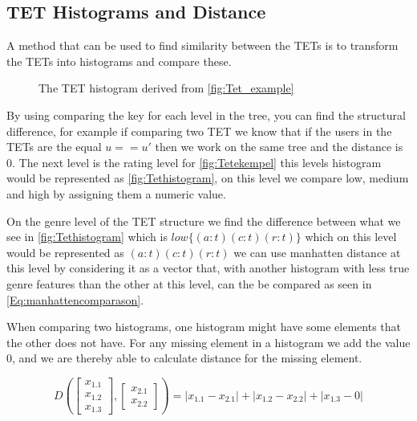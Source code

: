 \subsection{TET Histograms and Distance}
	A method that can be used to find similarity between the TETs is to transform the TETs into histograms and compare these\cite{JAEGER201330}. 
	\begin{figure}[H]
		\centering
		\begin{adjustbox}{width=0.5\textwidth}
			
		\end{adjustbox}
		\caption{The TET histogram derived from \autoref{fig:Tet_example}}
		\label{fig:Tethistogram}
	\end{figure}

	By using comparing the key for each level in the tree, you can find the structural difference, for example if comparing two TET we know that if the users in the TETs are the equal $u == u'$ then we work on the same tree and the distance is $0$. The next level is the rating level for \autoref{fig:Tetekempel} this levels histogram would be represented as \autoref{fig:Tethistogram}, on this level we compare low, medium and high by assigning them a numeric value.
	
	On the genre level of the TET structure we find the difference between what we see in \autoref{fig:Tethistogram} which is $low\{(a:t)(c:t)(r:t)\}$ which on this level would be represented as $(a:t)(c:t)(r:t)$ we can use manhatten distance at this level by considering it as a vector that, with another histogram with less true genre features than the other at this level, can the be compared as seen in \autoref{Eq:manhattencomparason}\cite{singh2013k}.
	
	When comparing two histograms, one histogram might have some elements that the other does not have. For any missing element in a histogram we add the value $0$, and we are thereby able to calculate distance for the missing element.
	
	\begin{equation}\label{Eq:manhattencomparason}
	D(\begin{bmatrix}
	x_{1.1} \\
	x_{1.2} \\
	x_{1.3}
	\end{bmatrix},
	\begin{bmatrix}
	x_{2.1} \\
	x_{2.2}
	\end{bmatrix})= |x_{1.1} - x_{2.1}| + |x_{1.2} - x_{2.2}| + |x_{1.3} - 0|
	\end{equation}
	
